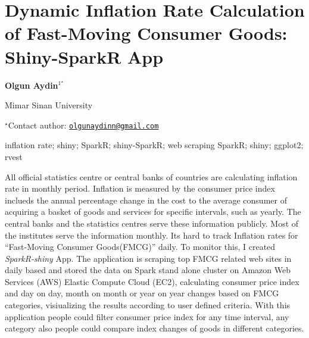 \documentclass[\main/boa.tex]{subfiles}
\begin{document}
\pagestyle{empty}

\section{Dynamic Inflation Rate Calculation of Fast-Moving Consumer Goods:
Shiny-SparkR App}

\begin{center}
  {\bf Olgun Aydin$^{1^\star}$}
\end{center}

\vskip 0.3cm

\begin{affiliations}
\begin{enumerate}
\begin{minipage}{0.915\textwidth}
\centering
\item Mimar Sinan University \\[-2pt]
\end{minipage}
\end{enumerate}
$^\star$Contact author: \href{mailto:olgunaydinn@gmail.com}{\nolinkurl{olgunaydinn@gmail.com}}\\
\end{affiliations}

\vskip 0.5cm

\begin{minipage}{0.915\textwidth}
\keywords inflation rate; shiny; SparkR; shiny-SparkR; web scraping
\packages SparkR; shiny; ggplot2; rvest
\end{minipage}

\vskip 0.8cm

All official statistics centre or central banks of countries are
calculating inflation rate in monthly period. Inflation is measured by
the consumer price index inclueds the annual percentage change in the
cost to the average consumer of acquiring a basket of goods and services
for specific intervals, such as yearly. The central banks and the
statistics centres serve these information publicly. Most of the
institutes serve the information monthly. Its hard to track Inflation
rates for ``Fast-Moving Consumer Goods(FMCG)'' daily. To monitor this, I
created \emph{SparkR-shiny} App. The application is scraping top FMCG
related web sites in daily based and stored the data on Spark stand
alone cluster on Amazon Web Services (AWS) Elastic Compute Cloud (EC2),
calculating consumer price index and day on day, month on month or year
on year changes based on FMCG categories, visiualizing the results
according to user defined criteria. With this application people could
filter consumer price index for any time interval, any category also
people could compare index changes of goods in different categories.
\end{document}
